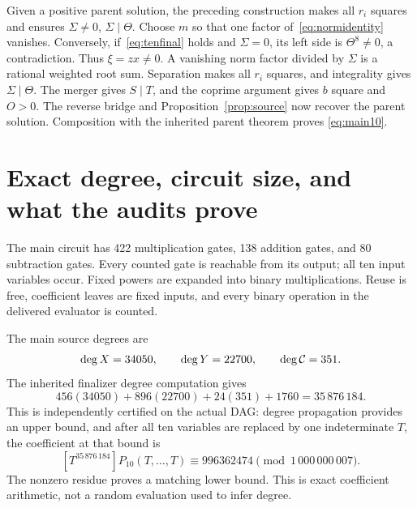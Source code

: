 \documentclass[11pt,letterpaper]{article}
\theoremstyle{definition}\newtheorem{definition}[theorem]{Definition}
\begin{document}
Given a positive parent solution, the preceding construction makes all
$r_i$ squares and ensures $\Sigma\ne0$, $\Sigma\mid\Theta$. Choose $m$
so that one factor of~\eqref{eq:normidentity} vanishes. Conversely,
if~\eqref{eq:tenfinal} holds and $\Sigma=0$, its left side is
$\Theta^8\ne0$, a contradiction. Thus $\xi=zx\ne0$. A vanishing norm
factor divided by $\Sigma$ is a rational weighted root sum. Separation
makes all $r_i$ squares, and integrality gives $\Sigma\mid\Theta$.
The merger gives $S\mid T$, and the coprime argument gives $b$ square and
$O>0$. The reverse bridge and Proposition~\ref{prop:source} now recover
the parent solution. Composition with the inherited parent theorem proves
\eqref{eq:main10}.

\section{Exact degree, circuit size, and what the audits prove}
\label{sec:audit}

The main circuit has 422 multiplication gates, 138 addition gates, and
80 subtraction gates. Every counted gate is reachable from its output;
all ten input variables occur. Fixed powers are expanded into binary
multiplications. Reuse is free, coefficient leaves are fixed inputs, and
every binary operation in the delivered evaluator is counted.

The main source degrees are
\[
\deg X=34050,\qquad \deg Y=22700,\qquad\deg\mathcal C=351.
\]
The inherited finalizer degree computation gives
\begin{equation}
456(34050)+896(22700)+24(351)+1760=35\,876\,184.
\label{eq:degree10}
\end{equation}
This is independently certified on the actual DAG: degree propagation
provides an upper bound, and after all ten variables are replaced by one
indeterminate $T$, the coefficient at that bound is
\[
[T^{35\,876\,184}]P_{10}(T,\ldots,T)
\equiv996362474\pmod{1\,000\,000\,007}.
\]
The nonzero residue proves a matching lower bound. This is exact
coefficient arithmetic, not a random evaluation used to infer degree.
\end{document}
